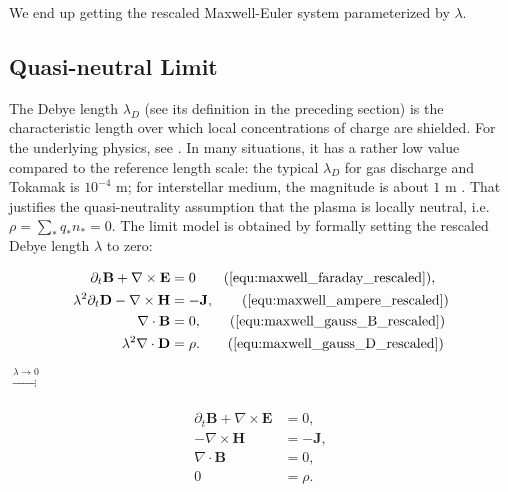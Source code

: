 \documentclass{article}
\begin{document}
We end up getting the rescaled Maxwell-Euler system parameterized by $\lambda$.

\subsection{Quasi-neutral Limit} \label{sec:quasi-neutral_limit}
The Debye length $\lambda_D$ (see its definition in the preceding section) is the characteristic length over which local concentrations of charge are shielded. For the underlying physics, see \cite[Sec. 1.4]{chen2016}. In many situations, it has a rather low value compared to the reference length scale: the typical $\lambda_D$ for gas discharge and Tokamak is $10^{-4}$ m; for interstellar medium, the magnitude is about $1$ m \cite[ch. 20]{Blandford_2013}. That justifies the quasi-neutrality assumption that the plasma is locally neutral, i.e. $\rho = \sum_* q_*n_* = 0$. The limit model is obtained by formally setting the rescaled Debye length $\lambda$ to zero:
\vspace{-\baselineskip}
\begin{center}
    \begin{minipage}{0.3\textwidth}
\begin{subequations}
\begin{align*}
    \partial_t \mathbf{B} + \nabla \times \mathbf{E} &= 0 \tag{\ref{equ:maxwell_faraday_rescaled}},\\ 
    \lambda^2 \partial_t \mathbf{D} - \nabla \times \mathbf{H} &= - \mathbf{J}, \tag{\ref{equ:maxwell_ampere_rescaled}}\\
    \nabla \cdot \mathbf{B} &= 0, \tag{\ref{equ:maxwell_gauss_B_rescaled}}\\
    \lambda^2 \nabla \cdot \mathbf{D} &= \rho. \tag{\ref{equ:maxwell_gauss_D_rescaled}}
\end{align*}
\end{subequations}
\end{minipage}
\hspace{0.6cm}$\xrightarrow[]{\lambda \rightarrow 0}$
\begin{minipage}{0.3\textwidth}
\begin{subequations}
\begin{align}
    \partial_t \mathbf{B} + \nabla \times \mathbf{E} &= 0, \label{equ:maxwell_faraday_limit} \\ 
    - \nabla \times \mathbf{H} &= - \mathbf{J}, \label{equ:maxwell_ampere_limit} \\
    \nabla \cdot \mathbf{B} &= 0,  \label{equ:maxwell_gauss_B_limit}\\
     0 &= \rho. \label{equ:maxwell_gauss_D_limit}
\end{align}
\end{subequations}
\end{minipage}
\end{center}
\end{document}
